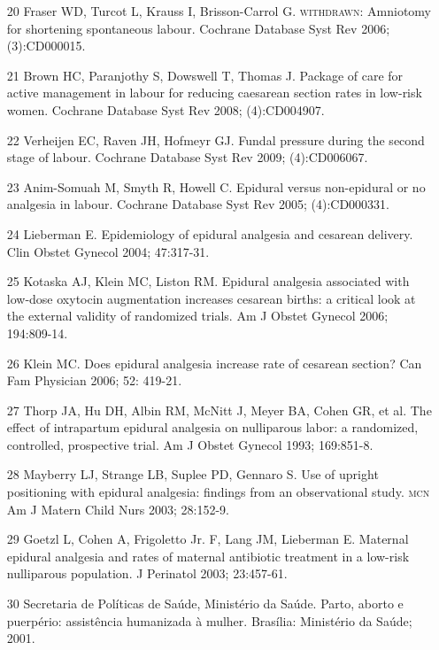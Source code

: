 \documentclass{article}
\begin{document}
\begin{itemize}
\item[20] Fraser WD, Turcot L, Krauss I, Brisson-Carrol G. \textsc{withdrawn}:
Amniotomy for shortening spontaneous labour. Cochrane Database Syst Rev 2006;
(3):CD000015.

\item[21] Brown HC, Paranjothy S, Dowswell T, Thomas J. Package of care for
active management in labour for reducing caesarean section rates in low-risk
women. Cochrane Database Syst Rev 2008; (4):CD004907.

\item[22] Verheijen EC, Raven JH, Hofmeyr GJ. Fundal pressure during the
second stage of labour. Cochrane Database Syst Rev 2009;
(4):CD006067.

\item[23] Anim-Somuah M, Smyth R, Howell C. Epidural versus non-epidural or
no analgesia in labour. Cochrane Database Syst Rev 2005;
(4):CD000331.

\item[24] Lieberman E. Epidemiology of epidural analgesia and cesarean
delivery. Clin Obstet Gynecol 2004; 47:317-31.

\item[25] Kotaska AJ, Klein MC, Liston RM. Epidural analgesia associated with
low-dose oxytocin augmentation increases cesarean births: a critical look at the
external validity of randomized trials. Am J Obstet Gynecol 2006;
194:809-14.

\item[26] Klein MC. Does epidural analgesia increase rate of cesarean
section? Can Fam Physician 2006; 52: 419-21.

\item[27] Thorp JA, Hu DH, Albin RM, McNitt J, Meyer BA, Cohen GR, et al. The
effect of intrapartum epidural analgesia on nulliparous labor: a randomized,
controlled, prospective trial. Am J Obstet Gynecol 1993;
169:851-8.

\item[28] Mayberry LJ, Strange LB, Suplee PD, Gennaro S. Use of upright
positioning with epidural analgesia: findings from an observational study. \textsc{mcn}
Am J Matern Child Nurs 2003; 28:152-9.

\item[29] Goetzl L, Cohen A, Frigoletto Jr. F, Lang JM, Lieberman E. Maternal
epidural analgesia and rates of maternal antibiotic treatment in a low-risk
nulliparous population. J Perinatol 2003; 23:457-61.

\item[30] Secretaria de Políticas de Saúde, Ministério da Saúde. Parto,
aborto e puerpério: assistência humanizada à mulher. Brasília: Ministério da
Saúde; 2001.


\end{itemize}
\end{document}
